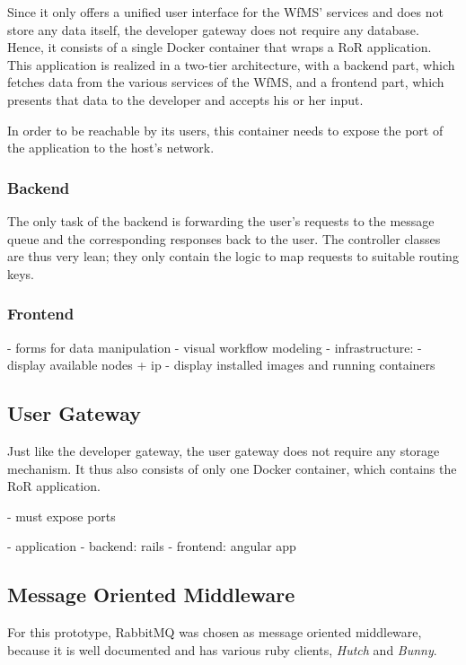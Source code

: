      Since it only offers a unified user interface for the \ac{WfMS}' services and does not store any data itself, the developer gateway does not require any database. Hence, it consists of a single Docker container that wraps a \ac{RoR} application. This application is realized in a two-tier architecture, with a backend part, which fetches data from the various services of the \ac{WfMS}, and a frontend part, which presents that data to the developer and accepts his or her input.

      In order to be reachable by its users, this container needs to expose the port of the application to the host's network.

      \subsubsection{Backend} %
      \label{ssub:backend}
        The only task of the backend is forwarding the user's requests to the message queue and the corresponding responses back to the user. The controller classes are thus very lean; they only contain the logic to map requests to suitable routing keys.


      \subsubsection{Frontend} %
        \label{ssub:frontend}
          - forms for data manipulation
          - visual workflow modeling
          - infrastructure:
            - display available nodes + ip
            - display installed images and running containers


  \subsection{User Gateway} %
    \label{sub:user_gateway}
    Just like the developer gateway, the user gateway does not require any storage mechanism. It thus also consists of only one Docker container, which contains the \ac{RoR} application.

    - must expose ports

      - application
        - backend: rails
        - frontend: angular app

  \subsection{Message Oriented Middleware} %
    \label{sub:message_oriented_middleware}
      For this prototype, RabbitMQ was chosen as message oriented middleware, because it is well documented and has various ruby clients, \eg \emph{Hutch} and \emph{Bunny}.

